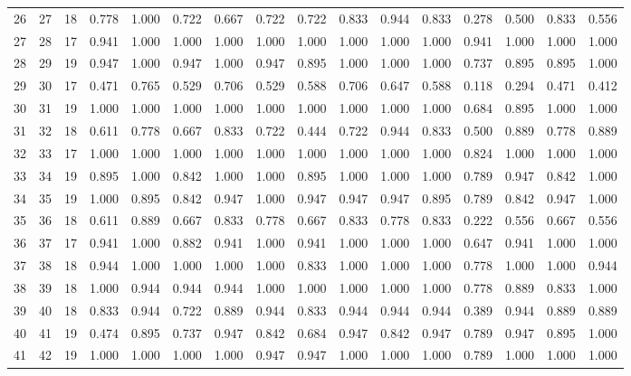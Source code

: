\begin{longtable}{lrllllllllllllll}
26 & 27 & 18 & 0.778 & 1.000 & 0.722 & 0.667 & 0.722 & 0.722 & 0.833 & 0.944 & 0.833 & 0.278 & 0.500 & 0.833 & 0.556 \\
27 & 28 & 17 & 0.941 & 1.000 & 1.000 & 1.000 & 1.000 & 1.000 & 1.000 & 1.000 & 1.000 & 0.941 & 1.000 & 1.000 & 1.000 \\
28 & 29 & 19 & 0.947 & 1.000 & 0.947 & 1.000 & 0.947 & 0.895 & 1.000 & 1.000 & 1.000 & 0.737 & 0.895 & 0.895 & 1.000 \\
29 & 30 & 17 & 0.471 & 0.765 & 0.529 & 0.706 & 0.529 & 0.588 & 0.706 & 0.647 & 0.588 & 0.118 & 0.294 & 0.471 & 0.412 \\
30 & 31 & 19 & 1.000 & 1.000 & 1.000 & 1.000 & 1.000 & 1.000 & 1.000 & 1.000 & 1.000 & 0.684 & 0.895 & 1.000 & 1.000 \\
31 & 32 & 18 & 0.611 & 0.778 & 0.667 & 0.833 & 0.722 & 0.444 & 0.722 & 0.944 & 0.833 & 0.500 & 0.889 & 0.778 & 0.889 \\
32 & 33 & 17 & 1.000 & 1.000 & 1.000 & 1.000 & 1.000 & 1.000 & 1.000 & 1.000 & 1.000 & 0.824 & 1.000 & 1.000 & 1.000 \\
33 & 34 & 19 & 0.895 & 1.000 & 0.842 & 1.000 & 1.000 & 0.895 & 1.000 & 1.000 & 1.000 & 0.789 & 0.947 & 0.842 & 1.000 \\
34 & 35 & 19 & 1.000 & 0.895 & 0.842 & 0.947 & 1.000 & 0.947 & 0.947 & 0.947 & 0.895 & 0.789 & 0.842 & 0.947 & 1.000 \\
35 & 36 & 18 & 0.611 & 0.889 & 0.667 & 0.833 & 0.778 & 0.667 & 0.833 & 0.778 & 0.833 & 0.222 & 0.556 & 0.667 & 0.556 \\
36 & 37 & 17 & 0.941 & 1.000 & 0.882 & 0.941 & 1.000 & 0.941 & 1.000 & 1.000 & 1.000 & 0.647 & 0.941 & 1.000 & 1.000 \\
37 & 38 & 18 & 0.944 & 1.000 & 1.000 & 1.000 & 1.000 & 0.833 & 1.000 & 1.000 & 1.000 & 0.778 & 1.000 & 1.000 & 0.944 \\
38 & 39 & 18 & 1.000 & 0.944 & 0.944 & 0.944 & 1.000 & 1.000 & 1.000 & 1.000 & 1.000 & 0.778 & 0.889 & 0.833 & 1.000 \\
39 & 40 & 18 & 0.833 & 0.944 & 0.722 & 0.889 & 0.944 & 0.833 & 0.944 & 0.944 & 0.944 & 0.389 & 0.944 & 0.889 & 0.889 \\
40 & 41 & 19 & 0.474 & 0.895 & 0.737 & 0.947 & 0.842 & 0.684 & 0.947 & 0.842 & 0.947 & 0.789 & 0.947 & 0.895 & 1.000 \\
41 & 42 & 19 & 1.000 & 1.000 & 1.000 & 1.000 & 0.947 & 0.947 & 1.000 & 1.000 & 1.000 & 0.789 & 1.000 & 1.000 & 1.000 \\
\end{longtable}
